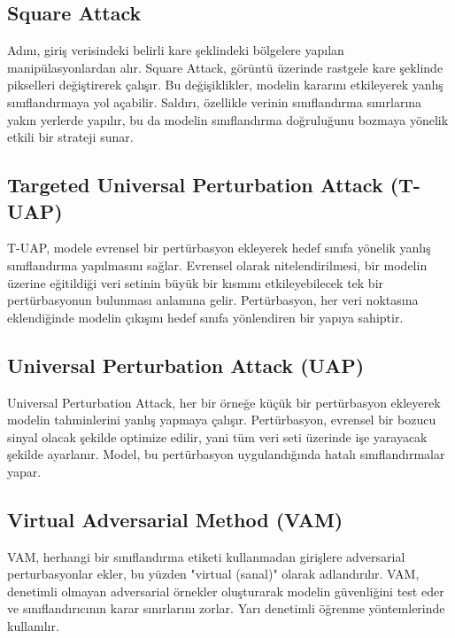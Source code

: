 \newpage

\subsection{Square Attack}

Adını, giriş verisindeki belirli kare şeklindeki bölgelere yapılan manipülasyonlardan alır. Square Attack, görüntü üzerinde rastgele kare şeklinde pikselleri değiştirerek çalışır. Bu değişiklikler, modelin kararını etkileyerek yanlış sınıflandırmaya yol açabilir. Saldırı, özellikle verinin sınıflandırma sınırlarına yakın yerlerde yapılır, bu da modelin sınıflandırma doğruluğunu bozmaya yönelik etkili bir strateji sunar.

\newpage

\subsection{Targeted Universal Perturbation Attack (T-UAP)}

T-UAP, modele evrensel bir pertürbasyon ekleyerek hedef sınıfa yönelik yanlış sınıflandırma yapılmasını sağlar. Evrensel olarak nitelendirilmesi, bir modelin üzerine eğitildiği veri setinin büyük bir kısmını etkileyebilecek tek bir pertürbasyonun bulunması anlamına gelir. Pertürbasyon, her veri noktasına eklendiğinde modelin çıkışını hedef sınıfa yönlendiren bir yapıya sahiptir.

\newpage

\subsection{Universal Perturbation Attack (UAP)}

Universal Perturbation Attack, her bir örneğe küçük bir pertürbasyon ekleyerek modelin tahminlerini yanlış yapmaya çalışır. Pertürbasyon, evrensel bir bozucu sinyal olacak şekilde optimize edilir, yani tüm veri seti üzerinde işe yarayacak şekilde ayarlanır. Model, bu pertürbasyon uygulandığında hatalı sınıflandırmalar yapar.

\newpage

\subsection{Virtual Adversarial Method (VAM)}

VAM, herhangi bir sınıflandırma etiketi kullanmadan girişlere adversarial perturbasyonlar ekler, bu yüzden "virtual (sanal)" olarak adlandırılır. VAM, denetimli olmayan adversarial örnekler oluşturarak modelin güvenliğini test eder ve sınıflandırıcının karar sınırlarını zorlar. Yarı denetimli öğrenme yöntemlerinde kullanılır.

